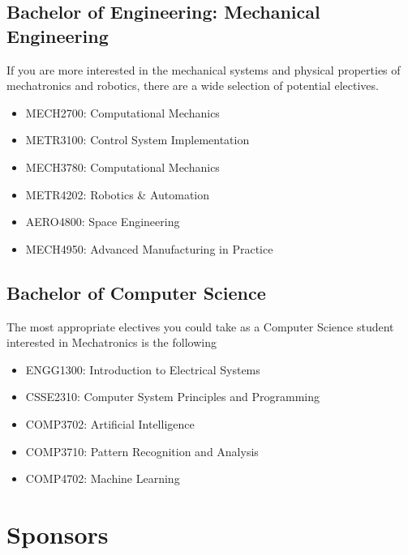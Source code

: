 \documentclass[a4paper,12pt]{report}
\begin{document}
\section{Bachelor of Engineering: Mechanical Engineering}
\vspace*{3mm}
If you are more interested in the mechanical systems and physical properties of mechatronics and robotics, there are a wide selection of potential electives.
\begin{multicols}{2}
    \begin{itemize}
        \item MECH2700: Computational Mechanics
        \item METR3100: Control System Implementation
        \item MECH3780: Computational Mechanics
        \item METR4202: Robotics \& Automation
        \item AERO4800: Space Engineering
        \item MECH4950: Advanced Manufacturing in Practice
    \end{itemize}
\end{multicols}

\newpage

\section{Bachelor of Computer Science}
\vspace*{3mm}
The most appropriate electives you could take as a Computer Science student interested in Mechatronics is the following
\begin{multicols}{2}
    \begin{itemize}
        \item ENGG1300: Introduction to Electrical Systems
        \item CSSE2310: Computer System Principles and Programming
        \item COMP3702: Artificial Intelligence
        \item COMP3710: Pattern Recognition and Analysis
        \item COMP4702: Machine Learning
    \end{itemize}
\end{multicols}


\chapter{Sponsors} %
\end{document}
